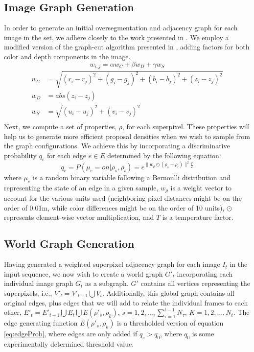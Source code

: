 \documentclass[10pt,letterpaper]{article}
\begin{document}
\subsection{Image Graph Generation}
	In order to generate an initial oversegmentation and adjacency graph for each image in the set, we adhere closely to the work presented in \cite{Erdogan12crv}. We employ a modified version of the graph-cut algorithm presented in \cite{felzenszwalb2004efficient}, adding factors for both color and depth components in the image.
\begin{equation}
w_{i,j}=\alpha w_C + \beta w_D + \gamma w_S
\end{equation}
\begin{align*}
w_C&=\sqrt{(r_i-r_j)^2+(g_i-g_j)^2+(b_i-b_j)^2+(z_i-z_j)^2} \\
w_D&=abs(z_i-z_j) \\
w_S&=\sqrt{(u_i-u_j)^2+(v_i-v_j)^2} \\
\end{align*}
	Next, we compute a set of properties, $\rho$, for each superpixel. These properties will help us to generate more efficient proposal densities when we wish to sample from the graph configurations. We achieve this by incorporating a discriminative probability $q_e$ for each edge $e\in{E}$ determined by the following equation: 
\begin{equation}
	q_e=P(\mu_e=on|\rho_s,\rho_t)=e^{\|w_\rho\odot(\rho_s-\rho_t)\|^2\frac{T}{2}}
	\label{eq:edgeProb}
\end{equation}
where $\mu_e$ is a random binary variable following a Bernoulli distribution and representing the state of an edge in a given sample, $w_\rho$ is a weight vector to account for the various units used (neighboring pixel distances might be on the order of 0.01m, while color differences might be on the order of 10 units), $\odot$ represents element-wise vector multiplication, and $T$ is a temperature factor.

\subsection{World Graph Generation}
	Having generated a weighted superpixel adjacency graph for each image $I_t$ in the input sequence, we now wish to create a world graph $G'_t$ incorporating each individual image graph $G_t$ as a subgraph. $G'$ contains all vertices representing the superpixels, i.e., $V'_t=V'_{t-1}{\bigcup}V_t$. Additionally, this global graph contains all original edges, plus edges that we will add to relate the individual frames to each other, $E'_t=E'_{t-1}{\bigcup}E_t{\bigcup}E(\rho'_s,\rho_k)$,
 $s=1,2,\ldots,\sum_{\tau=1}^{t-1}{N_\tau}$, 
 $K=1,2,\ldots,N_t$.
	The edge generating function $E(\rho'_s,\rho_k)$ is a thresholded version of equation \ref{eq:edgeProb}, where edges are only added if $q_e>q_0$, where $q_0$ is some experimentally determined threshold value.
	
\end{document}
